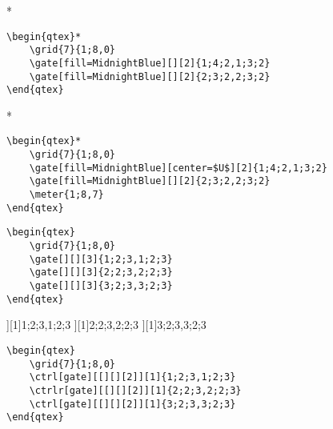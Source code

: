 \documentclass[aps,prl,showpacs,notitlepage,floatfix,superscriptaddress,nofootinbib]{revtex4-2}
\begin{document}
\begin{Code}
\begin{qtex}*
\end{qtex}
\tcblower
\begin{lstlisting}
\begin{qtex}*
    \grid{7}{1;8,0}
    \gate[fill=MidnightBlue][][2]{1;4;2,1;3;2}
    \gate[fill=MidnightBlue][][2]{2;3;2,2;3;2}
\end{qtex}
\end{lstlisting}
\end{Code}

\begin{Code}
\begin{qtex}*
\end{qtex}
\tcblower
\begin{lstlisting}
\begin{qtex}*
    \grid{7}{1;8,0}
    \gate[fill=MidnightBlue][center=$U$][2]{1;4;2,1;3;2}
    \gate[fill=MidnightBlue][][2]{2;3;2,2;3;2}
    \meter{1;8,7}
\end{qtex}
\end{lstlisting}
\end{Code}

\begin{Code}
\begin{qtex}
\end{qtex}
\tcblower
\begin{lstlisting}
\begin{qtex}
    \grid{7}{1;8,0}
    \gate[][][3]{1;2;3,1;2;3}
    \gate[][][3]{2;2;3,2;2;3}
    \gate[][][3]{3;2;3,3;2;3}
\end{qtex}
\end{lstlisting}
\end{Code}

\begin{Code}
\begin{qtex}
\ctrl[gate][[][][2]][1]{1;2;3,1;2;3}
\ctrlr[gate][[][][2]][1]{2;2;3,2;2;3}
\ctrl[gate][[][][2]][1]{3;2;3,3;2;3}
\end{qtex}
\tcblower
\begin{lstlisting}
\begin{qtex}
    \grid{7}{1;8,0}
    \ctrl[gate][[][][2]][1]{1;2;3,1;2;3}
    \ctrlr[gate][[][][2]][1]{2;2;3,2;2;3}
    \ctrl[gate][[][][2]][1]{3;2;3,3;2;3}
\end{qtex}
\end{lstlisting}
\end{Code}
\end{document}
